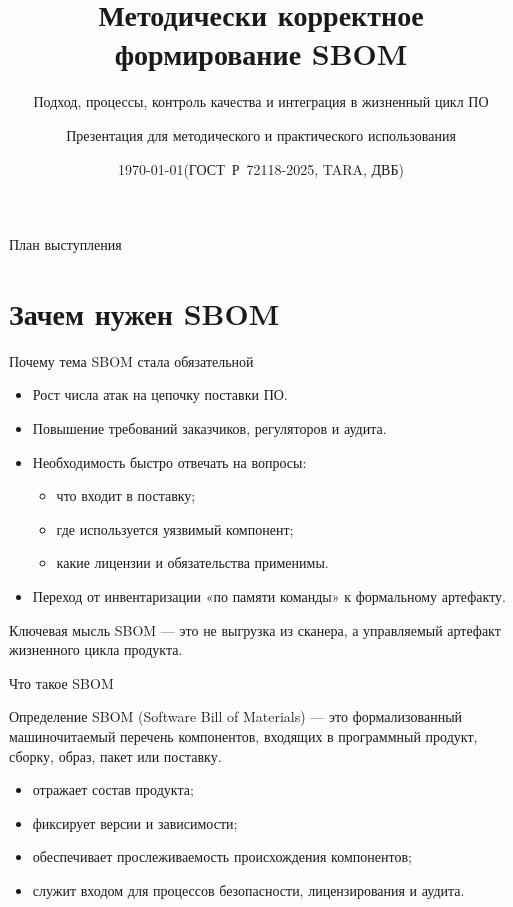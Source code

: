 \documentclass[aspectratio=169,10pt]{beamer}
\title[SBOM]{Методически корректное формирование SBOM}
\subtitle{Подход, процессы, контроль качества и интеграция в жизненный цикл ПО}
\author[Методика SBOM]{Презентация для методического и практического использования}
\date{\today\quad(ГОСТ~Р~72118-2025, TARA, ДВБ)}
\begin{document}
\begin{frame}
  \titlepage
\end{frame}

\begin{frame}{План выступления}
\tableofcontents
\end{frame}

\section{Зачем нужен SBOM}

\begin{frame}{Почему тема SBOM стала обязательной}
\begin{itemize}
  \item Рост числа атак на цепочку поставки ПО.
  \item Повышение требований заказчиков, регуляторов и аудита.
  \item Необходимость быстро отвечать на вопросы:
  \begin{itemize}
    \item что входит в поставку;
    \item где используется уязвимый компонент;
    \item какие лицензии и обязательства применимы.
  \end{itemize}
  \item Переход от инвентаризации «по памяти команды» к формальному артефакту.
\end{itemize}

\begin{block}{Ключевая мысль}
SBOM — это не выгрузка из сканера, а управляемый артефакт жизненного цикла продукта.
\end{block}
\end{frame}

\begin{frame}{Что такое SBOM}
\begin{block}{Определение}
SBOM (Software Bill of Materials) — это формализованный машиночитаемый перечень компонентов, входящих в программный продукт, сборку, образ, пакет или поставку.
\end{block}

\begin{itemize}
  \item отражает состав продукта;
  \item фиксирует версии и зависимости;
  \item обеспечивает прослеживаемость происхождения компонентов;
  \item служит входом для процессов безопасности, лицензирования и аудита.
\end{itemize}
\end{frame}
\end{document}
